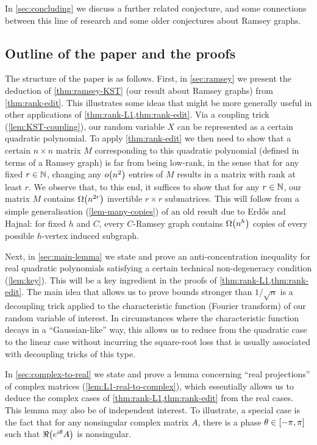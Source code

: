 \documentclass{daj}
\theoremstyle{plain}
\theoremstyle{plain}
\theoremstyle{plain}
\theoremstyle{plain}
\theoremstyle{definition}
\theoremstyle{plain}
\theoremstyle{plain}
\theoremstyle{definition}
\theoremstyle{definition}
\theoremstyle{plain}
\let\originalleft\left
\let\originalright\right
\renewcommand{\left}{\mathopen{}\mathclose\bgroup\originalleft}
\renewcommand{\right}{\aftergroup\egroup\originalright}
\begin{document}
In \cref{sec:concluding} we discuss a further related conjecture, and some connections between this line of research and some older conjectures about Ramsey graphs.

\subsection{Outline of the paper and the proofs}\label{sec:outline}

The structure of the paper is as follows. First, in \cref{sec:ramsey} we present the deduction of \cref{thm:ramsey-KST} (our result about Ramsey graphs) from \cref{thm:rank-edit}. This illustrates
some ideas that might be more generally useful in other applications
of \cref{thm:rank-L1,thm:rank-edit}. Via a coupling trick (\cref{lem:KST-coupling}), our random variable $X$ can be represented
as a certain quadratic polynomial. To apply \cref{thm:rank-edit} we then need to show
that a certain $n\times n$ matrix $M$ corresponding to this quadratic
polynomial (defined in terms of a Ramsey graph) is far from being
low-rank, in the sense that for any fixed $r\in\mathbb{N}$, changing any
$o\left(n^{2}\right)$ entries of $M$ results in a matrix with rank
at least $r$. We observe that, to this end, it suffices to show that
for any $r\in\mathbb{N}$, our matrix $M$ contains $\Omega\left(n^{2r}\right)$
invertible $r\times r$ submatrices. This will follow from a simple
generalisation (\cref{lem-many-copies}) of an old result due to Erd\H os and Hajnal: for fixed
$h$ and $C$, every $C$-Ramsey graph contains $\Omega\left(n^{h}\right)$
copies of every possible $h$-vertex induced subgraph.

Next, in \cref{sec:main-lemma} we state and prove an anti-concentration inequality for real quadratic
polynomials satisfying a certain technical non-degeneracy condition (\cref{lem:key}). This will be a key ingredient in the proofs of \cref{thm:rank-L1,thm:rank-edit}. The main idea that allows us to prove bounds stronger than $1/\sqrt{n}$ is
a decoupling trick applied to the characteristic function (Fourier
transform) of our random variable of interest. In circumstances where the characteristic function decays in a ``Gaussian-like'' way,
this allows us to reduce from the quadratic case to the linear case
without incurring the square-root loss that is usually associated
with decoupling tricks of this type.

In \cref{sec:complex-to-real} we state and prove a lemma concerning ``real projections'' of complex matrices (\cref{lem:L1-real-to-complex}), which essentially allows us to deduce the complex cases of \cref{thm:rank-L1,thm:rank-edit} from the real cases. This lemma may also be of independent interest. To illustrate, a special case is the fact that for any nonsingular complex matrix $A$, there is a phase
$\theta\in\left[-\pi,\pi\right]$ such that $\Re\left(e^{i\theta}A\right)$
is nonsingular.
\end{document}
